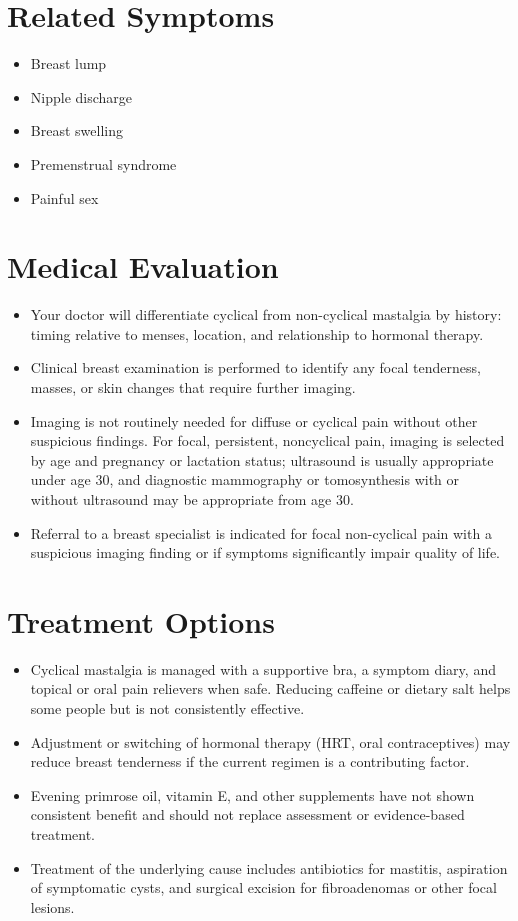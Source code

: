 \section*{Related Symptoms}
\begin{itemize}
 \item Breast lump
 \item Nipple discharge
 \item Breast swelling
 \item Premenstrual syndrome
 \item Painful sex
\end{itemize}


\section*{Medical Evaluation}
\begin{itemize}
 \item Your doctor will differentiate cyclical from non-cyclical mastalgia by history: timing relative to menses, location, and relationship to hormonal therapy.
 \item Clinical breast examination is performed to identify any focal tenderness, masses, or skin changes that require further imaging.
 \item Imaging is not routinely needed for diffuse or cyclical pain without other suspicious findings. For focal, persistent, noncyclical pain, imaging is selected by age and pregnancy or lactation status; ultrasound is usually appropriate under age 30, and diagnostic mammography or tomosynthesis with or without ultrasound may be appropriate from age 30.
 \item Referral to a breast specialist is indicated for focal non-cyclical pain with a suspicious imaging finding or if symptoms significantly impair quality of life.
\end{itemize}

\section*{Treatment Options}
\begin{itemize}
 \item Cyclical mastalgia is managed with a supportive bra, a symptom diary, and topical or oral pain relievers when safe. Reducing caffeine or dietary salt helps some people but is not consistently effective.
 \item Adjustment or switching of hormonal therapy (HRT, oral contraceptives) may reduce breast tenderness if the current regimen is a contributing factor.
 \item Evening primrose oil, vitamin E, and other supplements have not shown consistent benefit and should not replace assessment or evidence-based treatment.
 \item Treatment of the underlying cause includes antibiotics for mastitis, aspiration of symptomatic cysts, and surgical excision for fibroadenomas or other focal lesions.
\end{itemize}

